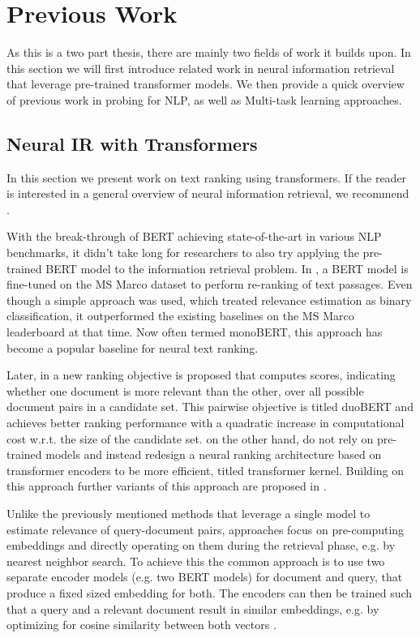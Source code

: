 \chapter{Previous Work}
\label{chap:prev}
As this is a two part thesis, there are mainly two fields of work it builds upon. In this section we will first introduce related work in neural information retrieval that leverage pre-trained transformer models. We then provide a quick overview of previous work in probing for NLP, as well as Multi-task learning approaches.

\section{Neural IR with Transformers}
In this section we present work on text ranking using transformers. If the reader is interested in a general overview of neural information retrieval, we recommend \cite{mitra2018an, Onal2017NeuralIR, Guo2020ADL}.

With the break-through of BERT \cite{devlin-etal-2019-bert} achieving state-of-the-art in various NLP benchmarks, it didn't take long for researchers to also try applying the pre-trained BERT model to the information retrieval problem. In \cite{Nogueira2019PassageRW}, a BERT model is fine-tuned on the MS Marco dataset \cite{DBLP:journals/corr/NguyenRSGTMD16} to perform re-ranking of text passages. Even though a simple approach was used, which treated relevance estimation as binary classification, it outperformed the existing baselines on the MS Marco leaderboard at that time. Now often termed monoBERT, this approach has become a popular baseline for neural text ranking.

Later, in \cite{Nogueira2019MultiStageDR} a new ranking objective is proposed that computes scores, indicating whether one document is more relevant than the other, over all possible document pairs in a candidate set. This pairwise objective is titled duoBERT and achieves better ranking performance with a quadratic increase in computational cost w.r.t. the size of the candidate set. \cite{DBLP:journals/corr/abs-1912-01385} on the other hand, do not rely on pre-trained models and instead redesign a neural ranking architecture based on transformer encoders to be more efficient, titled transformer kernel. Building on this approach further variants of this approach are proposed in \cite{Hofsttter2020LocalSO, 10.1145/3404835.3463049}.

Unlike the previously mentioned methods that leverage a single model to estimate relevance of query-document pairs,  approaches focus on pre-computing embeddings and directly operating on them during the retrieval phase, e.g. by nearest neighbor search. To achieve this the common approach is to use two separate encoder models (e.g. two BERT models) for document and query, that produce a fixed sized embedding for both. The encoders can then be trained such that a query and a relevant document result in similar embeddings, e.g. by optimizing for cosine similarity between both vectors \cite{Humeau2020Poly-encoders, 10.1145/3397271.3401075, DBLP:journals/corr/abs-1908-10084}.

